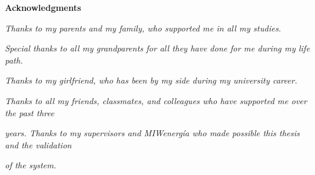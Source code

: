 \thispagestyle{empty}

\begin{center}
  {\bf \Huge Acknowledgments}
\end{center}

\vspace{4cm}

\emph{ Thanks to my parents and my family, who supported me in all my studies. }

\emph{ Special thanks to all my grandparents for all they have done for me during my life path. }

\emph{ Thanks to my girlfriend, who has been by my side during my university career. }

\emph{ Thanks to all my friends, classmates, and colleagues who have supported me over the past three }

\emph{ years. Thanks to my supervisors and MIWenergía who made possible this thesis and the validation }

\emph{ of the system. }
